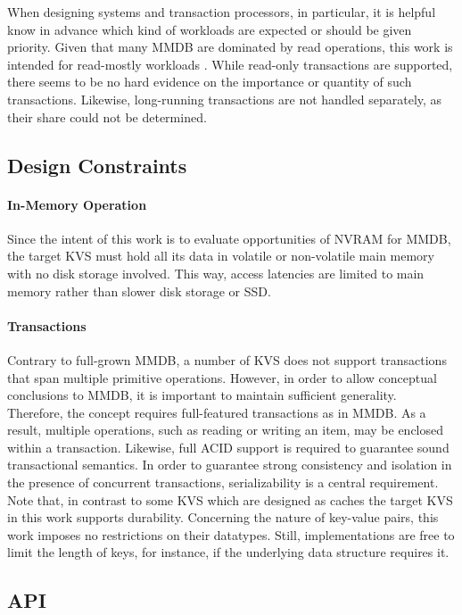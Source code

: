 When designing systems and transaction processors, in particular, it is helpful
know in advance which kind of workloads are expected or should be given
priority. Given that many MMDB are dominated by read operations, this work is
intended for read-mostly workloads \cite{andrei2017sap}. While read-only
transactions are supported, there seems to be no hard evidence on the importance
or quantity of such transactions. Likewise, long-running transactions are not
handled separately, as their share could not be determined.

\subsection{Design Constraints}

\paragraph{In-Memory Operation}

Since the intent of this work is to evaluate opportunities of NVRAM for MMDB,
the target KVS must hold all its data in volatile or non-volatile main memory
with no disk storage involved. This way, access latencies are limited to main
memory rather than slower disk storage or SSD.

\paragraph{Transactions}

Contrary to full-grown MMDB, a number of KVS does not support transactions that
span multiple primitive operations. However, in order to allow conceptual
conclusions to MMDB, it is important to maintain sufficient generality.
Therefore, the concept requires full-featured transactions as in MMDB. As a
result, multiple operations, such as reading or writing an item, may be enclosed
within a transaction. Likewise, full ACID support is required to guarantee sound
transactional semantics. In order to guarantee strong consistency and isolation
in the presence of concurrent transactions, serializability is a central
requirement. Note that, in contrast to some KVS which are designed as caches the
target KVS in this work supports durability. Concerning the nature of key-value
pairs, this work imposes no restrictions on their datatypes. Still,
implementations are free to limit the length of keys, for instance, if the
underlying data structure requires it.

\subsection{API}

